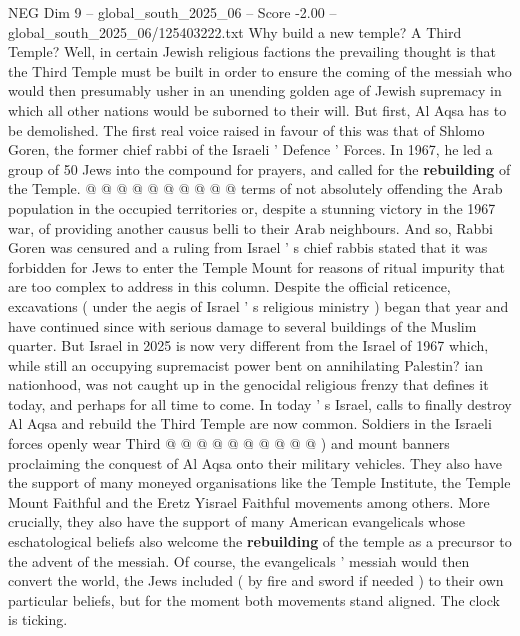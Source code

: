 \begin{textsample}{NEG Dim 9 – global\_south\_2025\_06 – Score -2.00 – global\_south\_2025\_06/125403222.txt}
Why build a new temple?
A Third Temple?
Well, in certain Jewish religious factions the prevailing thought is that the Third Temple must be built in order to ensure the coming of the messiah who would then presumably usher in an unending golden age of Jewish supremacy in which all other nations would be suborned to their will.
But first, Al Aqsa has to be demolished.
The first real voice raised in favour of this was that of Shlomo Goren, the former chief rabbi of the Israeli ' Defence ' Forces.
In 1967, he led a group of 50 Jews into the compound for prayers, and called for the \textbf{rebuilding} of the Temple. @ @ @ @ @ @ @ @ @ @ terms of not absolutely offending the Arab population in the occupied territories or, despite a stunning victory in the 1967 war, of providing another causus belli to their Arab neighbours.
And so, Rabbi Goren was censured and a ruling from Israel ' s chief rabbis stated that it was forbidden for Jews to enter the Temple Mount for reasons of ritual impurity that are too complex to address in this column.
Despite the official reticence, excavations ( under the aegis of Israel ' s religious ministry ) began that year and have continued since with serious damage to several buildings of the Muslim quarter.
But Israel in 2025 is now very different from the Israel of 1967 which, while still an occupying supremacist power bent on annihilating Palestin? ian nationhood, was not caught up in the genocidal religious frenzy that defines it today, and perhaps for all time to come.
In today ' s Israel, calls to finally destroy Al Aqsa and rebuild the Third Temple are now common.
Soldiers in the Israeli forces openly wear Third @ @ @ @ @ @ @ @ @ @ ) and mount banners proclaiming the conquest of Al Aqsa onto their military vehicles.
They also have the support of many moneyed organisations like the Temple Institute, the Temple Mount Faithful and the Eretz Yisrael Faithful movements among others.
More crucially, they also have the support of many American evangelicals whose eschatological beliefs also welcome the \textbf{rebuilding} of the temple as a precursor to the advent of the messiah.
Of course, the evangelicals ' messiah would then convert the world, the Jews included ( by fire and sword if needed ) to their own particular beliefs, but for the moment both movements stand aligned.
The clock is ticking.

\end{textsample}
